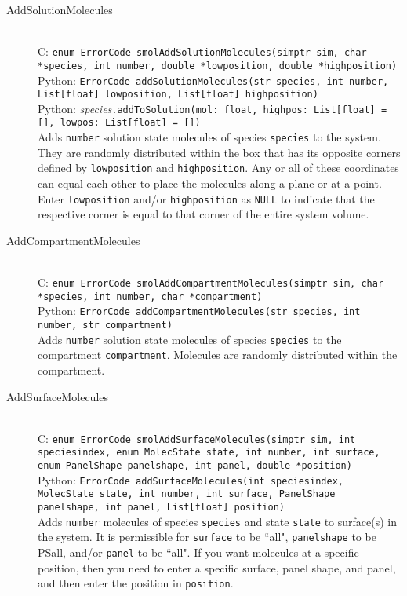 \documentclass {book}
\newcommand {\ttt} {\texttt}
\begin{document}
\begin{description}
\item[AddSolutionMolecules]
\hfill \\
C: \ttt{enum ErrorCode smolAddSolutionMolecules(simptr sim, char *species, int number, double *lowposition, double *highposition)}\\
Python: \ttt{ErrorCode addSolutionMolecules(str species, int number, List[float] lowposition, List[float] highposition)}\\
Python: \textit{species}\ttt{.addToSolution(mol: float, highpos: List[float] = [], lowpos: List[float] = [])}\\
Adds \ttt{number} solution state molecules of species \ttt{species} to the system. They are randomly distributed within the box that has its opposite corners defined by \ttt{lowposition} and \ttt{highposition}. Any or all of these coordinates can equal each other to place the molecules along a plane or at a point. Enter \ttt{lowposition} and/or \ttt{highposition} as \ttt{NULL} to indicate that the respective corner is equal to that corner of the entire system volume.

\item[AddCompartmentMolecules]
\hfill \\
C: \ttt{enum ErrorCode smolAddCompartmentMolecules(simptr sim, char *species, int number, char *compartment)}\\
Python: \ttt{ErrorCode addCompartmentMolecules(str species, int number, str compartment)}\\
Adds \ttt{number} solution state molecules of species \ttt{species} to the compartment \ttt{compartment}. Molecules are randomly distributed within the compartment.

\item[AddSurfaceMolecules]
\hfill \\
C: \ttt{enum ErrorCode smolAddSurfaceMolecules(simptr sim, int speciesindex, enum MolecState state, int number, int surface, enum PanelShape panelshape, int panel, double *position)}\\
Python: \ttt{ErrorCode addSurfaceMolecules(int speciesindex, MolecState state, int number, int surface, PanelShape panelshape, int panel, List[float] position)}\\
Adds \ttt{number} molecules of species \ttt{species} and state \ttt{state} to surface(s) in the system. It is permissible for \ttt{surface} to be ``all", \ttt{panelshape} to be PSall, and/or \ttt{panel} to be ``all". If you want molecules at a specific position, then you need to enter a specific surface, panel shape, and panel, and then enter the position in \ttt{position}.


\end{description}
\end{document}
